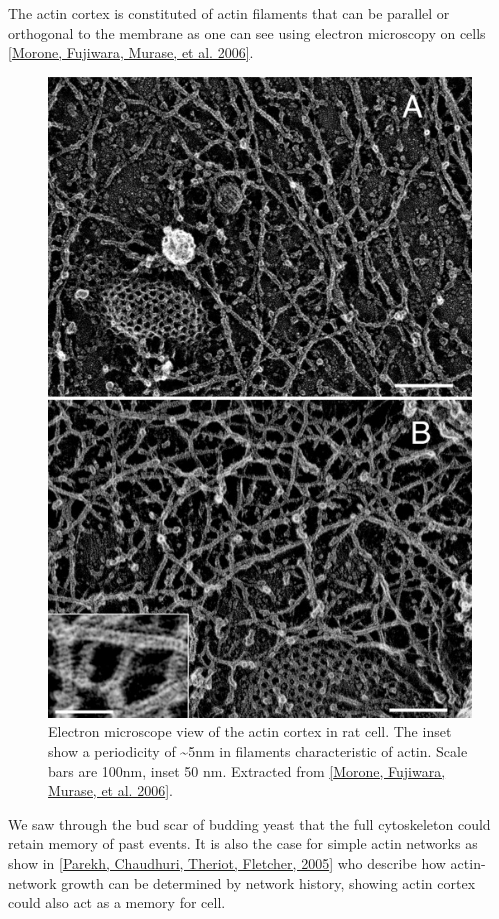 \documentclass[A4paperpaper,11pt,english]{sphinxmanual}
\begin{document}
The actin cortex is constituted of actin filaments that can be parallel or
orthogonal to the membrane as one can see using electron microscopy on cells
{\hyperref[parts/part1:morone2006b]{{[}Morone, Fujiwara, Murase,  et al.  2006{]}}}.
\begin{figure}[htbp]
\centering
\capstart

\includegraphics[width=0.700\linewidth]{Actin-Cortex-Moronne-2006.jpg}
\caption{Electron microscope view of the actin cortex in rat cell. The inset
show a periodicity of \textasciitilde{}5nm in filaments characteristic of actin.  Scale
bars are 100nm, inset 50 nm. Extracted from {\hyperref[parts/part1:morone2006b]{{[}Morone, Fujiwara, Murase,  et al.  2006{]}}}.}\end{figure}

We saw through the bud scar of budding yeast that the full cytoskeleton could
retain memory of past events. It is also the case for simple actin networks as
show in {\hyperref[parts/part1:parekh2005]{{[}Parekh, Chaudhuri, Theriot, Fletcher,  2005{]}}} who describe how actin-network growth can be
determined by network history, showing actin cortex could also act as a memory
for cell.
\end{document}
